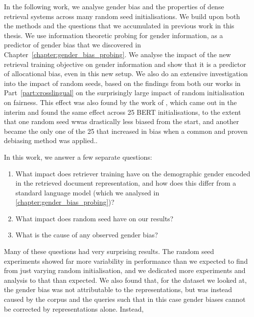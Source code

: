 In the following work, we analyse gender bias and the properties of dense retrieval systems across many random seed initialisations. We build upon both the methods and the questions that we accumulated in previous work in this thesis. We use information theoretic probing for gender information, as a predictor of gender bias that we discovered in Chapter~\ref{chapter:gender_bias_probing}. We analyse the impact of the new retrieval training objective on gender information and show that it is a predictor of allocational bias, even in this new setup. We also do an extensive investigation into the impact of random seeds, based on the findings from both our works in Part~\ref{part:crosslingual} on the surprisingly large impact of random initialisation on fairness. This effect was also found by the work of \citet{multiberts}, which came out in the interim and found the same effect across 25 BERT initialisations, to the extent that one random seed wwas drastically less biased from the start, and another became the only one of the 25 that increased in bias when a common and proven debiasing method was applied..

In this work, we answer a few separate questions:
\begin{enumerate}
    \item What impact does retriever training have on the demographic gender encoded in the retrieved document representation, and how does this differ from a standard language model (which we analysed in \ref{chapter:gender_bias_probing})?
    \item What impact does random seed have on our results?
    \item What is the cause of any observed gender bias?
\end{enumerate}

Many of these questions had very surprising results. The random seed experiments showed far more variability in performance than we expected to find from just varying random initialisation, and we dedicated more experiments and analysis to that than expected. We also found that, for the dataset we looked at, the gender bias was not attributable to the representations, but was instead caused by the corpus and the queries such that in this case gender biases cannot be corrected by representations alone. Instead, 

